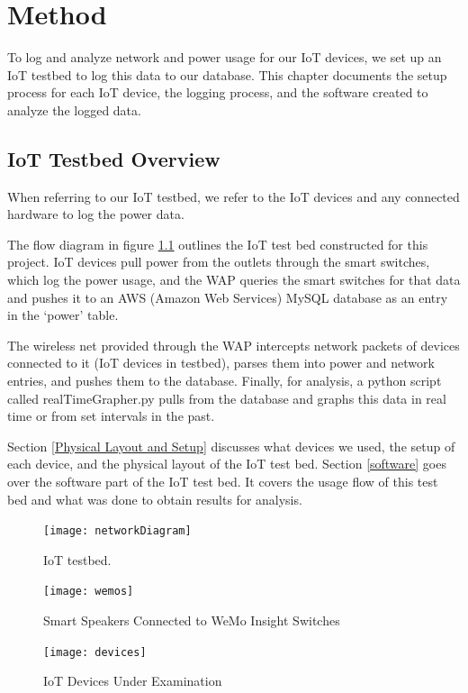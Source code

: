 \chapter{Method}
\label{Method}
To log and analyze network and power usage for our IoT devices, we set up an IoT testbed to log this data to our database. This chapter documents the setup process for each IoT device, the logging process, and the software created to analyze the logged data.

\section{IoT Testbed Overview}
When referring to our IoT testbed, we refer to the IoT devices and any connected hardware to log the power data.

The flow diagram in figure \ref{fig:network} outlines the IoT test bed constructed for this project. IoT devices pull power from the outlets through the smart switches, which log the power usage, and the WAP queries the smart switches for that data and pushes it to an AWS (Amazon Web Services)\cite{rds} MySQL\cite{mysql} database as an entry in the `power' table.

The wireless net provided through the WAP intercepts network packets of devices connected to it (IoT devices in testbed), parses them into power and network entries, and pushes them to the database. Finally, for analysis, a python script called realTimeGrapher.py pulls from the database and graphs this data in real time or from set intervals in the past.

Section \ref{Physical Layout and Setup} discusses what devices we used, the setup of each device, and the physical layout of the IoT test bed. Section \ref{software} goes over the software part of the IoT test bed. It covers the usage flow of this test bed and what was done to obtain results for analysis.

\begin{figure}[H]
    \centering
    \texttt{[image: networkDiagram]}
    \caption{IoT testbed.}
    \label{fig:network}
\end{figure}

\begin{figure}[H]
    \centering
    \texttt{[image: wemos]}
    \caption{Smart Speakers Connected to WeMo Insight Switches}
    \label{fig:wemo}
\end{figure}

\begin{figure}[H]
    \centering
    \texttt{[image: devices]}
    \caption{IoT Devices Under Examination}
    \label{fig:devices}
\end{figure}


